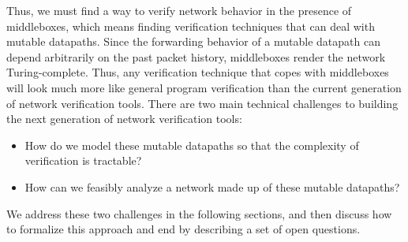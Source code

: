 Thus, we must find a way to verify network behavior in the presence of middleboxes, which means finding verification techniques that can deal with mutable datapaths. Since the forwarding behavior of a mutable datapath can depend arbitrarily on the past packet history, middleboxes render the network Turing-complete. Thus, any verification technique that copes with middleboxes will look much more like general program verification than the current generation of network verification tools. There are two main technical challenges to building the next generation of network verification tools:
\begin{itemize}
\item How do we model these mutable datapaths so that the complexity of verification is tractable?
\item How can we feasibly analyze a network made up of these mutable datapaths?
\end{itemize}
We address these two challenges in the following sections, and then discuss  how to formalize this approach and end by describing a set of open questions.
